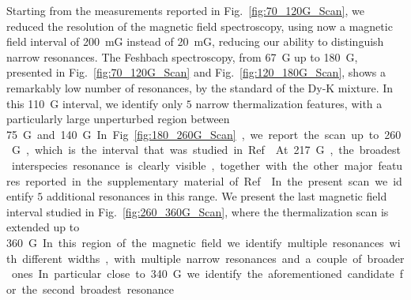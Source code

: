 Starting from the measurements reported in Fig.~\ref{fig:70_120G_Scan}, we reduced the resolution of the  magnetic field spectroscopy, using now a magnetic field interval of \SI{200}{mG} instead of \SI{20}{mG}, reducing our ability to distinguish narrow resonances. The Feshbach spectroscopy, from \SI{67}{G} up to \SI{180}{G}, presented in Fig.~\ref{fig:70_120G_Scan} and Fig.~\ref{fig:120_180G_Scan}, shows a remarkably low number of resonances, by the standard of the Dy-K mixture. In this \SI{110}{G} interval, we identify only $5$ narrow thermalization features, with a particularly large unperturbed region between \SI{75}G and \SI{140}{G}. In Fig.~\ref{fig:180_260G_Scan}, we report the scan up to \SI{260}{G}, which is the interval that was studied in Ref.~\cite{Ravensbergen2020rif}. At \SI{217}G, the broadest interspecies resonance is clearly visible, together with the other major features reported in the supplementary material of Ref.~\cite{Ravensbergen2020rif}. In the present scan we identify $5$ additional resonances in this range. We present the last magnetic field interval studied in Fig.~\ref{fig:260_360G_Scan}, where the thermalization scan is extended up to \SI{360}G. In this region of the magnetic field we identify multiple resonances with different widths, with multiple narrow resonances and a couple of broader ones. In particular close to \SI{340}G we identify the aforementioned candidate for the second broadest resonance.


